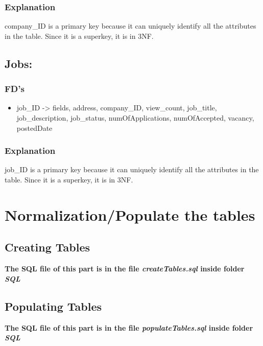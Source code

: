 \subsubsection{Explanation}
company\_ID is a primary key because it can uniquely identify all the attributes in the table. Since it is a superkey, it is in 3NF.

\subsection{Jobs:}
\subsubsection{FD's}
\begin{itemize}
    \item job\_ID -> fields, address, company\_ID, view\_count, job\_title, job\_description, job\_status, numOfApplications, numOfAccepted, vacancy, postedDate
\end{itemize}

\subsubsection{Explanation}
job\_ID is a primary key because it can uniquely identify all the attributes in the table. Since it is a superkey, it is in 3NF.

\newpage
\section{Normalization/Populate the tables}
\subsection{Creating Tables}
\textbf{The SQL file of this part is in the file \textit{createTables.sql} inside folder \textit{SQL}}

\newpage
\subsection{Populating Tables}
\textbf{The SQL file of this part is in the file \textit{populateTables.sql} inside folder \textit{SQL}}


